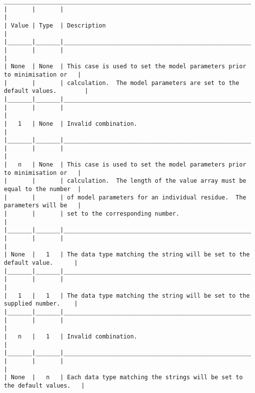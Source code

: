 {\begin{verbatim}
____________________________________________________________________________________________
|       |       |                                                                          |
| Value | Type  | Description                                                              |
|_______|_______|__________________________________________________________________________|
|       |       |                                                                          |
| None  | None  | This case is used to set the model parameters prior to minimisation or   |
|       |       | calculation.  The model parameters are set to the default values.        |
|_______|_______|__________________________________________________________________________|
|       |       |                                                                          |
|   1   | None  | Invalid combination.                                                     |
|_______|_______|__________________________________________________________________________|
|       |       |                                                                          |
|   n   | None  | This case is used to set the model parameters prior to minimisation or   |
|       |       | calculation.  The length of the value array must be equal to the number  |
|       |       | of model parameters for an individual residue.  The parameters will be   |
|       |       | set to the corresponding number.                                         |
|_______|_______|__________________________________________________________________________|
|       |       |                                                                          |
| None  |   1   | The data type matching the string will be set to the default value.      |
|_______|_______|__________________________________________________________________________|
|       |       |                                                                          |
|   1   |   1   | The data type matching the string will be set to the supplied number.    |
|_______|_______|__________________________________________________________________________|
|       |       |                                                                          |
|   n   |   1   | Invalid combination.                                                     |
|_______|_______|__________________________________________________________________________|
|       |       |                                                                          |
| None  |   n   | Each data type matching the strings will be set to the default values.   |

\end{verbatim}}
